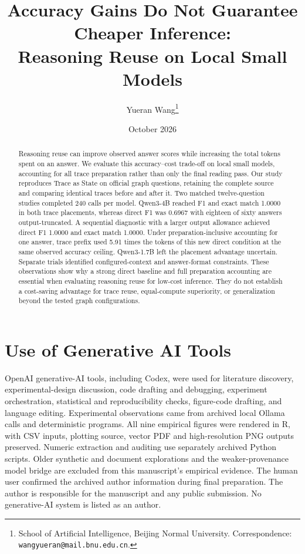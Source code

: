 \documentclass[10pt]{article}
\title{\textbf{Accuracy Gains Do Not Guarantee Cheaper Inference:\\
Reasoning Reuse on Local Small Models}}
\author{Yueran Wang\thanks{School of Artificial Intelligence, Beijing Normal University. Correspondence: \texttt{wangyueran@mail.bnu.edu.cn}.}}
\date{October 2026}
\begin{document}
\ifdefined\XeTeXversion{}\fi

\maketitle

\begin{abstract}
Reasoning reuse can improve observed answer scores while increasing the total tokens spent on an answer. We evaluate this accuracy--cost trade-off on local small models, accounting for all trace preparation rather than only the final reading pass. Our study reproduces Trace as State on official graph questions, retaining the complete source and comparing identical traces before and after it. Two matched twelve-question studies completed 240 calls per model. Qwen3-4B reached F1 and exact match 1.0000 in both trace placements, whereas direct F1 was 0.6967 with eighteen of sixty answers output-truncated. A sequential diagnostic with a larger output allowance achieved direct F1 1.0000 and exact match 1.0000. Under preparation-inclusive accounting for one answer, trace prefix used 5.91 times the tokens of this new direct condition at the same observed accuracy ceiling. Qwen3-1.7B left the placement advantage uncertain. Separate trials identified configured-context and answer-format constraints. These observations show why a strong direct baseline and full preparation accounting are essential when evaluating reasoning reuse for low-cost inference. They do not establish a cost-saving advantage for trace reuse, equal-compute superiority, or generalization beyond the tested graph configurations.
\end{abstract}



\section*{Use of Generative AI Tools}

OpenAI generative-AI tools, including Codex, were used for literature discovery, experimental-design discussion, code drafting and debugging, experiment orchestration, statistical and reproducibility checks, figure-code drafting, and language editing. Experimental observations came from archived local Ollama calls and deterministic programs. All nine empirical figures were rendered in R, with CSV inputs, plotting source, vector PDF and high-resolution PNG outputs preserved. Numeric extraction and auditing use separately archived Python scripts. Older synthetic and document explorations and the weaker-provenance model bridge are excluded from this manuscript's empirical evidence. The human user confirmed the archived author information during final preparation. The author is responsible for the manuscript and any public submission. No generative-AI system is listed as an author.
\end{document}
